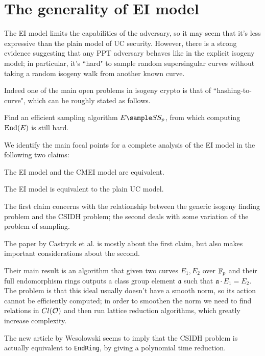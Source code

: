 \section{The generality of EI model}\label{section_EIgeneral}

The EI model limits the capabilities of the adversary, so it may seem that it's less expressive than the plain model of UC security. However, there is a strong evidence suggesting that any PPT adversary behaves like in the explicit isogeny model; in particular, it's ``hard" to sample random supersingular curves without taking a random isogeny walk from another known curve.

Indeed one of the main open problems in isogeny crypto is that of ``hashing-to-curve", which can be roughly stated as follows.
\begin{problem}[Informal]
    Find an efficient sampling algorithm $E\sample SS_p$, from which computing $\operatorname{End}(E)$ is still hard.
\end{problem}

We identify the main focal points for a complete analysis of the EI model in the following two claims:

\begin{claim}\label{claim_CMEI}
    The EI model and the CMEI model are equivalent.
\end{claim}

\begin{claim}\label{claim_EIUC}
    The EI model is equivalent to the plain UC model.
\end{claim}

The first claim concerns with the relationship between the generic isogeny finding problem and the CSIDH problem; the second deals with some variation of the problem of sampling.

The paper by Castryck et al. \cite{CSIDH_EndRing} is mostly about the first claim, but also makes important considerations about the second.

Their main result is an algorithm that given two curves $E_1,E_2$ over $\mathbb{F}_p$ and their full endomorphism rings outputs a class group element $\mathfrak{a}$ such that $\mathfrak{a}\cdot E_1=E_2$. The problem is that this ideal usually doesn't have a smooth norm, so its action cannot be efficiently computed; in order to smoothen the norm we need to find relations in $Cl(\mathcal{O})$ and then run lattice reduction algorithms, which greatly increase complexity.

The new article by Wesolowski \cite{Weso_CSIDH} seems to imply that the CSIDH problem is actually equivalent to \texttt{EndRing}, by giving a polynomial time reduction.

